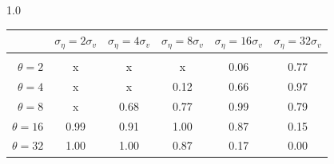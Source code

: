 \documentclass[12pt]{article}
\begin{document}
\begin{table}[h!]
\vspace{10pt}
\begin{subtable}{1.0\textwidth}
    \centering
\begin{tabular}{rccccc}
\hline  
            & \multicolumn{1}{l}{$\sigma_{\eta} =2\sigma_{v}$} & \multicolumn{1}{l}{$\sigma_{\eta} =4\sigma_{v}$} & \multicolumn{1}{l}{$\sigma_{\eta} =8\sigma_{v}$} & \multicolumn{1}{l}{$\sigma_{\eta} =16\sigma_{v}$} & \multicolumn{1}{l}{$\sigma_{\eta} =32\sigma_{v}$} \\ \hline  \vspace{-3mm} \\        
$\theta=2$  & x                                                 & x                                                 & x                                                 & 0.06                                               & 0.77                                               \\ \hline
$\theta=4$  & x                                                 & x                                                 & 0.12                                              & 0.66                                               & 0.97                                               \\ \hline
$\theta=8$  & x                                                 & 0.68                                              & 0.77                                              & 0.99                                               & 0.79                                               \\ \hline
$\theta=16$ & 0.99                                              & 0.91                                              & 1.00                                              & 0.87                                               & 0.15                                               \\ \hline
$\theta=32$ & 1.00                                              & 1.00                                              & 0.87                                              & 0.17                                               & 0.00                                               \\ \hline
\end{tabular}
\end{subtable}


\end{table}
\end{document}
